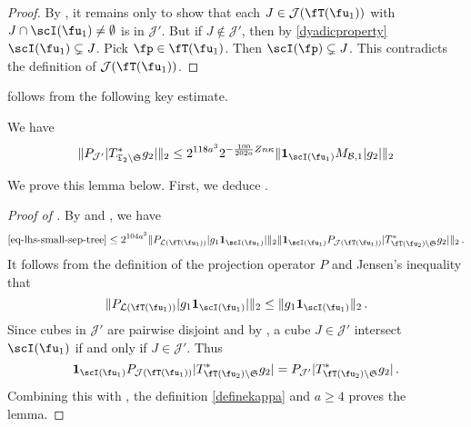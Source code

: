     \begin{proof}
        By , it remains only to show that each $J \in \mathcal{J}(\fT(\fu_1))$ with $J \cap \scI(\fu_1) \ne \emptyset$ is in $\mathcal{J}'$. But if $J \notin \mathcal{J}'$, then by \eqref{dyadicproperty} $\scI(\fu_1) \subsetneq J$. Pick $\fp \in \fT(\fu_1)$. Then $\scI(\fp) \subsetneq J$. This contradicts the definition of $\mathcal{J}(\fT(\fu_1))$.
    \end{proof}

     follows from the following key estimate.

    \begin{lemma}
        \label{bound-for-tree-projection}
        We have
        $$
            \|P_{\mathcal{J}'}|T_{\mathfrak{T}_2 \setminus \mathfrak{S}}^* g_2|\|_2
            \le 2^{118a^3} 2^{-\frac{100}{202a}Zn\kappa} \|\mathbf{1}_{\scI(\fu_1)} M_{\mathcal{B},1} |g_2|\|_2
        $$
    \end{lemma}

    We prove this lemma below. First, we deduce .

    \begin{proof}[Proof of ]
        By  and , we have
        \begin{align*}
            \eqref{eq-lhs-small-sep-tree} \le 2^{104a^3} \|P_{\mathcal{L}(\fT(\fu_1))} |g_1\mathbf{1}_{\scI(\fu_1)}| \|_2 \|\mathbf{1}_{\scI(\fu_1)} P_{\mathcal{J}(\fT(\fu_1) )}|T_{\fT(\fu_2) \setminus \mathfrak{S}}^* g_2|\|_2\,.
        \end{align*}
        It follows from the definition of the projection operator $P$ and Jensen's inequality that
        $$
            \|P_{\mathcal{L}(\fT(\fu_1))} |g_1\mathbf{1}_{\scI(\fu_1)}| \|_2 \le \|g_1 \mathbf{1}_{\scI(\fu_1)}\|_2\,.
        $$
        Since cubes in $\mathcal{J}'$ are pairwise disjoint and by , a cube $J \in \mathcal{J}'$ intersect $\scI(\fu_1)$ if and only if $J \in \mathcal{J}'$. Thus
        $$
            \mathbf{1}_{\scI(\fu_1)} P_{\mathcal{J}(\fT(\fu_1) )}|T_{\fT(\fu_2) \setminus \mathfrak{S}}^* g_2| = P_{\mathcal{J}'}|T_{\fT(\fu_2) \setminus \mathfrak{S}}^* g_2|\,.
        $$
        Combining this with , the definition \eqref{definekappa} and $a \ge 4$ proves the lemma.
    \end{proof}

